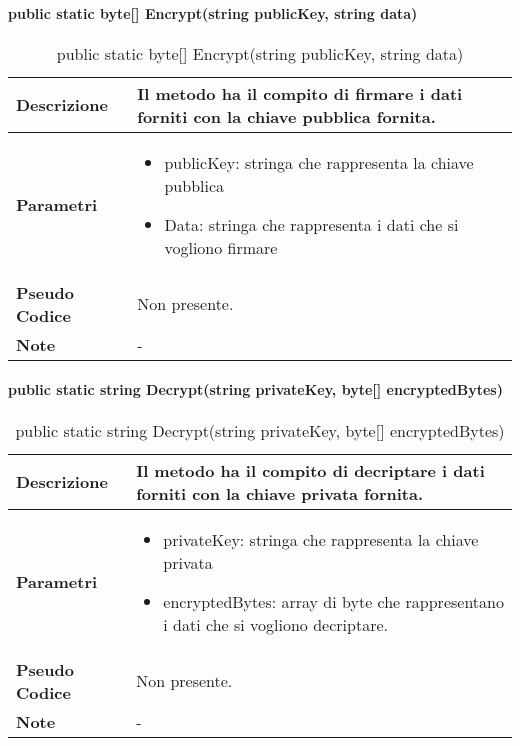 \paragraph{public static byte[] Encrypt(string publicKey, string data)}
\begin{center}
    \begin{longtable}{|p{3cm}|p{9cm}|}%
    \caption{public static byte[] Encrypt(string publicKey, string data)}
    \endfirsthead
    \endhead
    \hline
    \textbf{Descrizione} & Il metodo ha il compito di firmare i dati forniti con la chiave pubblica fornita.\\
    \hline
    \textbf{Parametri} &      
    \begin{itemize}
        \item publicKey: stringa che rappresenta la chiave pubblica
        \item Data: stringa che rappresenta i dati che si vogliono firmare
    \end{itemize}
    \\
    \hline
    \textbf{Pseudo Codice} & 
    Non presente.
    \\
    \hline
    \textbf{Note} & 
    -
    \\
    \hline
    \end{longtable}
    \end{center}



\paragraph{public static string Decrypt(string privateKey, byte[] encryptedBytes)}
\begin{center}
    \begin{longtable}{|p{3cm}|p{9cm}|}%
    \caption{public static string Decrypt(string privateKey, byte[] encryptedBytes)}
    \endfirsthead
    \endhead
    \hline
    \textbf{Descrizione} & Il metodo ha il compito di decriptare i dati forniti con la chiave privata fornita.\\
    \hline
    \textbf{Parametri} &      
    \begin{itemize}
        \item privateKey: stringa che rappresenta la chiave privata
        \item encryptedBytes: array di byte che rappresentano i dati che si vogliono decriptare.
    \end{itemize}
    \\
    \hline
    \textbf{Pseudo Codice} & 
    Non presente.
    \\
    \hline
    \textbf{Note} & 
    -
    \\
    \hline
    \end{longtable}
    \end{center}


